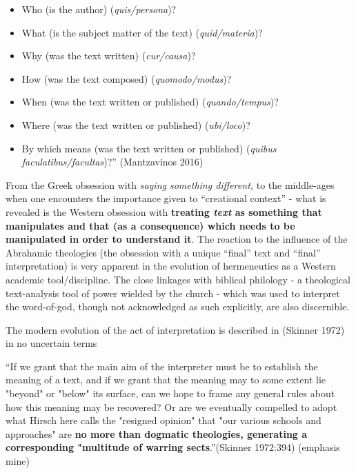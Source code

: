 \begin{itemize}
\item Who (is the author) (\textit{quis/persona})?

 \item What (is the subject matter of the text) (\textit{quid/materia})?

 \item Why (was the text written) (\textit{cur/causa})?

 \item How (was the text composed) (\textit{quomodo/modus})?

 \item When (was the text written or published) (\textit{quando/tempus})?

 \item Where (was the text written or published) (\textit{ubi/loco})?

 \item By which means (was the text written or published) (\textit{quibus faculatibus/facultas})?” (Mantzavinos 2016)

\end{itemize}

From the Greek obsession with \textit{saying something different,} to the middle-ages when one encounters the importance given to “creational context” - what is revealed is the Western obsession with \textbf{treating \textit{text} as something that manipulates and that (as a consequence) which needs to be manipulated in order to understand it}. The reaction to the influence of the Abrahamic theologies (the obsession with a unique “final” text and “final” interpretation) is very apparent in the evolution of hermeneutics as a Western academic tool/discipline. The close linkages with biblical philology - a theological text-analysis tool of power wielded by the church - which was used to interpret the word-of-god, though not acknowledged as such explicitly, are also discernible.

The modern evolution of the act of interpretation is described in (Skinner 1972) in no uncertain terms

\begin{myquote}
“If we grant that the main aim of the interpreter must be to establish the meaning of a text, and if we grant that the meaning may to some extent lie "beyond" or "below" its surface, can we hope to frame any general rules about how this meaning may be recovered? Or are we eventually compelled to adopt what Hirsch here calls the "resigned opinion" that "our various schools and approaches" are \textbf{no more than dogmatic theologies, generating a corresponding "multitude of warring sects}.”\hfill (Skinner 1972:394) (emphasis mine)
\end{myquote}

